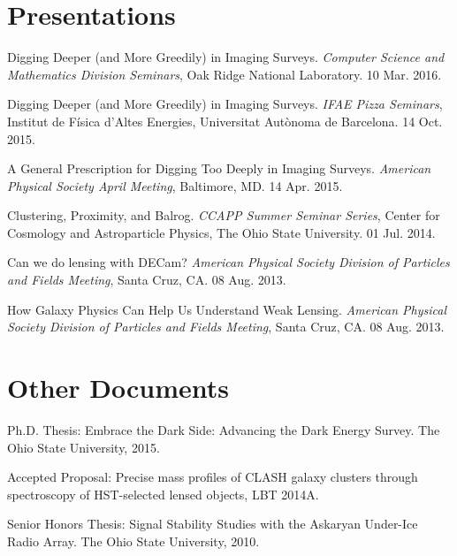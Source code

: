 \documentclass[12pt,a4paper,sans]{moderncv}	%
\begin{document}
\section{Presentations}

\begin{achievements}
\item Digging Deeper (and More Greedily) in Imaging Surveys. \textit{Computer Science and Mathematics Division Seminars}, Oak Ridge National Laboratory. 10 Mar. 2016.
\item Digging Deeper (and More Greedily) in Imaging Surveys. \textit{IFAE Pizza Seminars}, Institut de F\'isica d'Altes Energies, Universitat Aut\`onoma de Barcelona. 14 Oct. 2015.
\item A General Prescription for Digging Too Deeply in Imaging Surveys. \textit{American Physical Society April Meeting}, Baltimore, MD. 14 Apr. 2015.
\item Clustering, Proximity, and Balrog. \textit{CCAPP Summer Seminar Series}, Center for Cosmology and Astroparticle Physics, The Ohio State University. 01 Jul. 2014.
\item Can we do lensing with DECam? \textit{American Physical Society Division of Particles and Fields Meeting}, Santa Cruz, CA. 08 Aug. 2013. 
\item How Galaxy Physics Can Help Us Understand Weak Lensing. \textit{American Physical Society Division of Particles and Fields Meeting}, Santa Cruz, CA. 08 Aug. 2013. 
\end{achievements}


\section{Other Documents}
\begin{achievements}
\item Ph.D. Thesis: Embrace the Dark Side: Advancing the Dark Energy Survey. The Ohio State University, 2015.
\item Accepted Proposal: Precise mass profiles of CLASH galaxy clusters through spectroscopy of HST-selected lensed objects, LBT 2014A.
\item Senior Honors Thesis: Signal Stability Studies with the Askaryan Under-Ice Radio Array. The Ohio State University, 2010.
\end{achievements}


\end{document}
